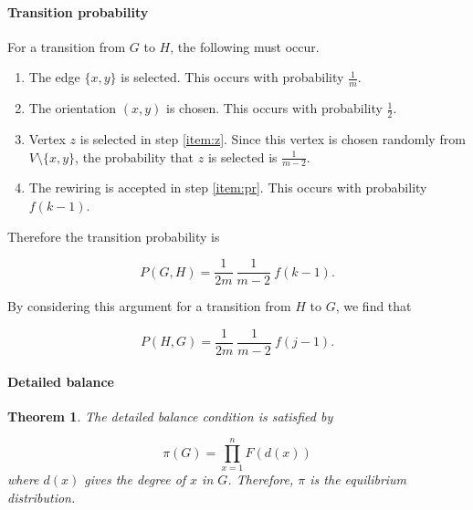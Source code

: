 \documentclass[a4paper,10pt]{article}
\newtheorem{theorem}{Theorem}
\begin{document}
\paragraph{Transition probability} For a transition from $G$ to $H$, the following must occur.
\begin{enumerate}
 \item The edge $\{x, y\}$ is selected. This occurs with probability $\frac{1}{m}$.
 \item The orientation $(x, y)$ is chosen. This occurs with probability $\frac{1}{2}$.
 \item Vertex $z$ is selected in step \ref{item:z}. Since this vertex is chosen randomly from $V \setminus \{x, y\}$, the probability that $z$ is selected is $\frac{1}{m - 2}$.
 \item The rewiring is accepted in step \ref{item:pr}. This occurs with probability $f(k - 1)$.
\end{enumerate}

\noindent Therefore the transition probability is 

\begin{equation}
 P(G, H) = \frac{1}{2m} \: \frac{1}{m - 2} \: f(k - 1).
\end{equation}

\noindent By considering this argument for a transition from $H$ to $G$, we find that

\begin{equation}
 P(H, G) = \frac{1}{2m} \: \frac{1}{m - 2} \: f(j - 1).
\end{equation}

\paragraph{Detailed balance}
\begin{theorem}
 The detailed balance condition is satisfied by

\begin{equation}
 \pi(G) = \prod_{x = 1}^{n} F(d(x))
\end{equation}
where $d(x)$ gives the degree of $x$ in $G$. Therefore, $\pi$ is the equilibrium distribution.

\end{theorem}
\end{document}
